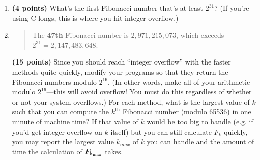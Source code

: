 \documentclass[11pt]{article}
\begin{document}
\begin{enumerate}[leftmargin=*]
\begin{enumerate}
\begin{quote}
  \medskip
  Edit 2: Part $c$ also required writing my own matrix exponentiation (to accomodate the modding). My own multiplication doesn't use SIMD or any serious optimizations, so I was curious to see how different it was from the graphics library. Here are the new results (no idea why iterative went down so much, I didn't touch it): 
  \begin{itemize}
    \item Recursive: n = 47
    \item Iterative: n = 202,663
    \item Matrix (my implementation): n = 55,309,376
    \item Matrix (nalgebra crate): n = 198,068,230
  \end{itemize}

  \medskip
  And new times. My matrix implementation and iterative are the same here, but I'm the difference is at the nanosecond level, so asymptotic behavior is much more effectively approximated by the 16 second tests.
  \begin{itemize}
    \item Recursive: 15.025ms
    \item Iterative: 125ns
    \item Matrix (my implementation): n = 125ns
    \item Matrix (nalgebra crate): n = 83ns
  \end{itemize}
\end{quote}
\item
{\bf (4 points)}
What's the first Fibonacci number that's at least $2^{31}$? (If you're using C longs, this is where you hit
integer overflow.)
\item
  \begin{quote}
    \color{purple}
  The \textbf{47th} Fibonacci number is $2,971,215,073$, which exceeds $2^{31} = 2,147,483,648$. 
  \end{quote}
{\bf (15 points)}
Since you should reach ``integer overflow'' with the faster methods quite quickly, modify your programs
so that they return the Fibonacci numbers modulo $2^{16}$. (In other words, make all of your
arithmetic modulo $2^{16}$---this will avoid overflow! You must do this regardless of whether or not your
system overflows.) For each method, what is the largest value of $k$ such that you can compute the
$k^\text{th}$ Fibonacci number (modulo 65536) in one minute of machine time? If that value of $k$ would be too big to handle (e.g. if you'd get integer overflow on $k$ itself) but you can still calculate $F_{k}$ quickly, you may report the largest value $k_{max}$ of $k$ you can handle and the amount of time the calculation of $F_{\rm k_{max}}$ takes. 
\begin{quote}
  \color{purple}


\end{quote}
\end{enumerate}
\end{enumerate}
\end{document}
